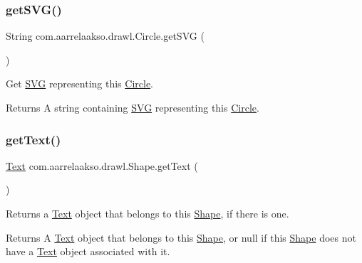 \subsubsection{\texorpdfstring{get\+S\+V\+G()}{getSVG()}}
{\footnotesize\ttfamily String com.\+aarrelaakso.\+drawl.\+Circle.\+get\+S\+VG (\begin{DoxyParamCaption}{ }\end{DoxyParamCaption})}



Get \hyperlink{classcom_1_1aarrelaakso_1_1drawl_1_1_s_v_g}{S\+VG} representing this \hyperlink{classcom_1_1aarrelaakso_1_1drawl_1_1_circle}{Circle}. 

\begin{DoxyReturn}{Returns}
A string containing \hyperlink{classcom_1_1aarrelaakso_1_1drawl_1_1_s_v_g}{S\+VG} representing this \hyperlink{classcom_1_1aarrelaakso_1_1drawl_1_1_circle}{Circle}. 
\end{DoxyReturn}
\mbox{\label{classcom_1_1aarrelaakso_1_1drawl_1_1_shape_a6f876978d4102974fedc5b41c93c7b26}} 
\subsubsection{\texorpdfstring{get\+Text()}{getText()}}
{\footnotesize\ttfamily \hyperlink{classcom_1_1aarrelaakso_1_1drawl_1_1_text}{Text} com.\+aarrelaakso.\+drawl.\+Shape.\+get\+Text (\begin{DoxyParamCaption}{ }\end{DoxyParamCaption})\hspace{0.3cm}{\ttfamily [inherited]}}



Returns a \hyperlink{classcom_1_1aarrelaakso_1_1drawl_1_1_text}{Text} object that belongs to this \hyperlink{classcom_1_1aarrelaakso_1_1drawl_1_1_shape}{Shape}, if there is one. 

\begin{DoxyReturn}{Returns}
A \hyperlink{classcom_1_1aarrelaakso_1_1drawl_1_1_text}{Text} object that belongs to this \hyperlink{classcom_1_1aarrelaakso_1_1drawl_1_1_shape}{Shape}, or {\ttfamily null} if this \hyperlink{classcom_1_1aarrelaakso_1_1drawl_1_1_shape}{Shape} does not have a \hyperlink{classcom_1_1aarrelaakso_1_1drawl_1_1_text}{Text} object associated with it. 
\end{DoxyReturn}
\mbox{\label{classcom_1_1aarrelaakso_1_1drawl_1_1_shape_aed4e9caa294aacc973b7a531a960e9e5}} 
